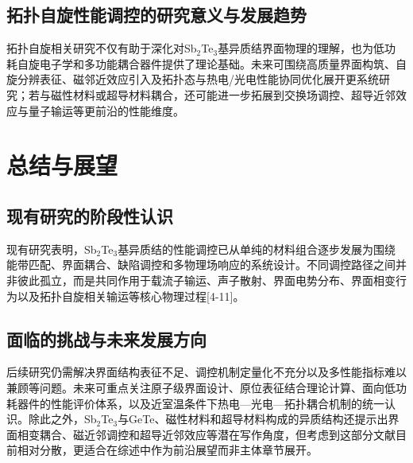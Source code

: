 \documentclass[12pt,a4paper]{ctexart}
\begin{document}
\subsection{拓扑自旋性能调控的研究意义与发展趋势}
拓扑自旋相关研究不仅有助于深化对Sb$_2$Te$_3$基异质结界面物理的理解，也为低功耗自旋电子学和多功能耦合器件提供了理论基础。未来可围绕高质量界面构筑、自旋分辨表征、磁邻近效应引入及拓扑态与热电/光电性能协同优化展开更系统研究；若与磁性材料或超导材料耦合，还可能进一步拓展到交换场调控、超导近邻效应与量子输运等更前沿的性能维度。

\section{总结与展望}

\subsection{现有研究的阶段性认识}
现有研究表明，Sb$_2$Te$_3$基异质结的性能调控已从单纯的材料组合逐步发展为围绕能带匹配、界面耦合、缺陷调控和多物理场响应的系统设计。不同调控路径之间并非彼此孤立，而是共同作用于载流子输运、声子散射、界面电势分布、界面相变行为以及拓扑自旋相关输运等核心物理过程[4-11]。

\subsection{面临的挑战与未来发展方向}
后续研究仍需解决界面结构表征不足、调控机制定量化不充分以及多性能指标难以兼顾等问题。未来可重点关注原子级界面设计、原位表征结合理论计算、面向低功耗器件的性能评价体系，以及近室温条件下热电—光电—拓扑耦合机制的统一认识。除此之外，Sb$_2$Te$_3$与GeTe、磁性材料和超导材料构成的异质结构还提示出界面相变耦合、磁近邻调控和超导近邻效应等潜在写作角度，但考虑到这部分文献目前相对分散，更适合在综述中作为前沿展望而非主体章节展开。
\end{document}
